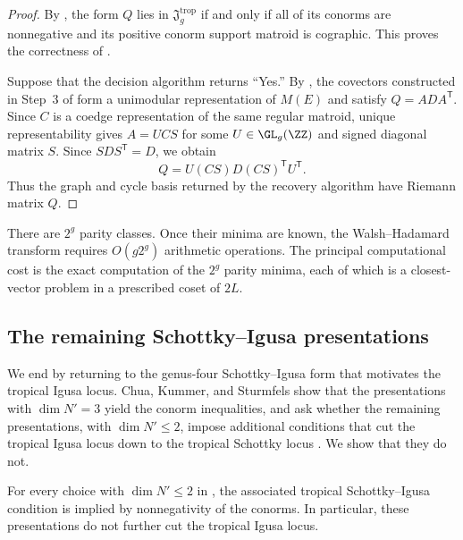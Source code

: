 \documentclass[11pt,letterpaper]{amsart}
\begin{document}
\begin{proof}
By , the form $Q$ lies in
$\mathfrak{J}^{\mathrm{trop}}_g$ if and only if all of its 
conorms are nonnegative and its positive conorm support matroid is
cographic. This proves the correctness of
.

Suppose that the decision algorithm returns ``Yes.'' By
, the covectors constructed in Step~3 of  form a unimodular representation of $M(E)$ and satisfy
$Q=A D A^{\mathsf T}.$ Since $C$ is a coedge representation of the same regular matroid, unique representability gives $A=UCS$ for some $U\in\GL_g(\ZZ)$ and signed diagonal matrix $S$. Since
$SDS^{\mathsf T}=D$, we obtain
\[
    Q
    =
    U(CS)D(CS)^{\mathsf T}U^{\mathsf T}.
\]
Thus the graph and cycle basis returned by the recovery algorithm
have Riemann matrix $Q$.
\end{proof}

\begin{remark}
There are $2^g$ parity classes. Once their minima are known, the Walsh--Hadamard transform requires $O(g2^g)$ arithmetic operations. The principal computational cost is the exact computation of the $2^g$ parity minima, each of which is a closest-vector problem in a prescribed coset of $2L$. 
\end{remark}

\subsection{The remaining Schottky--Igusa presentations}


We end by returning to the genus-four Schottky--Igusa form that motivates the tropical Igusa locus. Chua, Kummer, and Sturmfels show that the presentations with $\dim N'=3$ yield the conorm inequalities, and ask whether the remaining presentations, with $\dim N'\leq2$, impose additional conditions that cut the tropical Igusa locus down to the tropical Schottky locus \cite[Question~4.10]{chua2019schottky}. We show that they do not.

\begin{proposition}\label{prop:remaining-schottky-igusa}
For every choice with $\dim N'\leq2$ in \cite[Question~4.10]{chua2019schottky}, the associated tropical Schottky--Igusa condition is implied by nonnegativity of the conorms. In particular, these presentations do not further cut the tropical Igusa locus.
\end{proposition}
\end{document}
